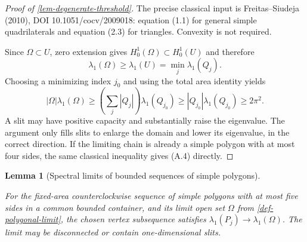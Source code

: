 \documentclass[11pt,a4paper]{article}
\theoremstyle{proofmanuscript}
\newtheorem{lemma}[theorem]{Lemma}
\begin{document}
\begin{proof}[Proof of \ref{lem-degenerate-threshold}]
The precise classical input is Freitas--Siudeja (2010), DOI 10.1051/cocv/2009018: equation (1.1) for general simple quadrilaterals and equation (2.3) for triangles. Convexity is not required.

Since \(\Omega\subset U\), zero extension gives \(H_0^1(\Omega)\subset H_0^1(U)\) and therefore \[
\lambda_1(\Omega)\ge\lambda_1(U)
=\min_j\lambda_1(Q_j).
\] Choosing a minimizing index \(j_0\) and using the total area identity yields \[
|\Omega|\lambda_1(\Omega)
\ge\left(\sum_j|Q_j|\right)\lambda_1(Q_{j_0})
\ge|Q_{j_0}|\lambda_1(Q_{j_0})
\ge2\pi^2.
\tag{A.4}
\] A slit may have positive capacity and substantially raise the eigenvalue. The argument only fills slits to enlarge the domain and lower its eigenvalue, in the correct direction. If the limiting chain is already a simple polygon with at most four sides, the same classical inequality gives (A.4) directly.

\end{proof}

\begin{lemma}[Spectral limits of bounded sequences of simple polygons]\label{lem-polygonal-spectral-continuity}

For the fixed-area counterclockwise sequence of simple polygons with at most five sides in a common bounded container, and its limit open set \(\Omega\) from \ref{def-polygonal-limit}, the chosen vertex subsequence satisfies \(\lambda_1(P_j)\to\lambda_1(\Omega)\). The limit may be disconnected or contain one-dimensional slits.

\end{lemma}
\end{document}
